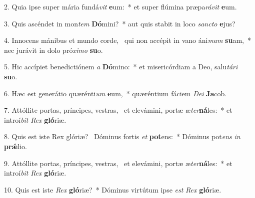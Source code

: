 2. Quia ipse super mária fundá\textit{vit} \textbf{e}um:~*  et super flúmina præpa\textit{rá}\textit{vit} \textbf{e}um.\

3. Quis ascéndet in mon\textit{tem} \textbf{Dó}mini?~*  aut quis stabit in loco \textit{sanc}\textit{to} \textbf{e}jus?\

4. Innocens mánibus et mundo corde, \dag\  qui non accépit in vano áni\textit{mam} \textbf{su}am,~*  nec jurávit in dolo pró\textit{xi}\textit{mo} \textbf{su}o.\

5. Hic accípiet benedictiónem \textit{a} \textbf{Dó}mino:~*  et misericórdiam a Deo, salu\textit{tá}\textit{ri} \textbf{su}o.\

6. Hæc est generátio quærénti\textit{um} \textbf{e}um,~*  quæréntium fáciem \textit{De}\textit{i} \textbf{Ja}cob.\

7. Attóllite portas, príncipes, vestras, \dag\  et elevámini, portæ æ\textit{ter}\textbf{ná}les:~*  et introí\textit{bit} \textit{Rex} \textbf{gló}riæ.\

8. Quis est iste Rex glóriæ? \dag\  Dóminus fortis \textit{et} \textbf{pot}ens:~*  Dóminus pot\textit{ens} \textit{in} \textbf{prǽ}lio.\

9. Attóllite portas, príncipes, vestras, \dag\  et elevámini, portæ æ\textit{ter}\textbf{ná}les:~*  et introí\textit{bit} \textit{Rex} \textbf{gló}riæ.\

10. Quis est iste \textit{Rex} \textbf{gló}riæ?~*  Dóminus virtútum ipse \textit{est} \textit{Rex} \textbf{gló}riæ.\

